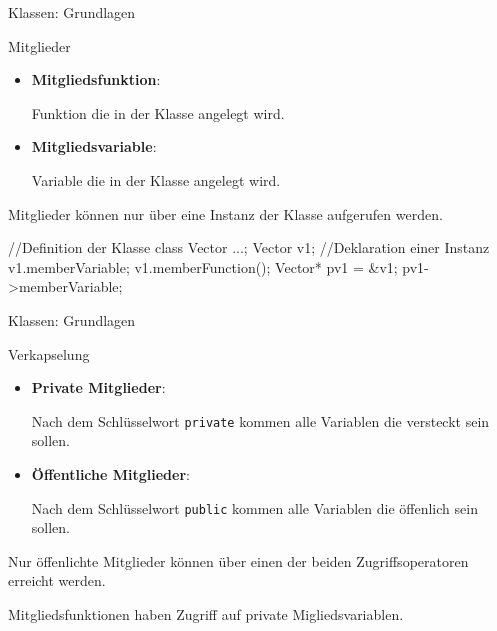 \ifnum\conditionmacro=1 \documentclass[handout,usenames,dvipsnames]{beamer}\fi
\begin{document}
\begin{frame}[fragile]{Klassen: Grundlagen}
\begin{block}{Mitglieder}
\begin{itemize}
\item \textbf{Mitgliedsfunktion}:

Funktion die in der Klasse angelegt wird.
\item \textbf{Mitgliedsvariable}: 

Variable die in der Klasse angelegt wird.
\end{itemize}

Mitglieder können nur über eine Instanz der Klasse aufgerufen werden. 
\end{block}

\begin{TPCpp}
//Definition der Klasse
class Vector {...}; 
Vector v1; //Deklaration einer Instanz
v1.memberVariable;
v1.memberFunction();
Vector* pv1 = &v1;
pv1->memberVariable;
\end{TPCpp}
\end{frame}


\begin{frame}[fragile]{Klassen: Grundlagen}
\begin{block}{Verkapselung}
\begin{itemize}
\item \textbf{Private Mitglieder}:

Nach dem Schlüsselwort \verb+private+ kommen alle Variablen die versteckt sein sollen.
\item \textbf{Öffentliche Mitglieder}:

Nach dem Schlüsselwort \verb+public+ kommen alle Variablen die öffenlich sein sollen.
\end{itemize}

Nur öffenlichte Mitglieder können über einen der beiden Zugriffsoperatoren erreicht werden. 

\vspace{3ex}

Mitgliedsfunktionen haben Zugriff auf private Migliedsvariablen.
\end{block}
\end{frame}
\end{document}
